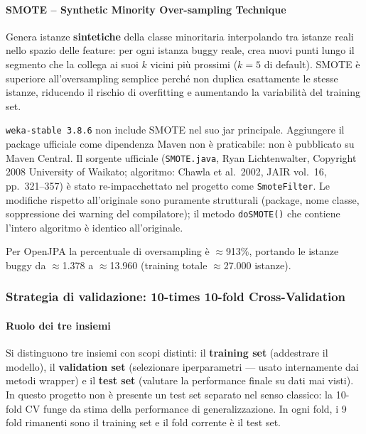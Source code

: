 \paragraph{SMOTE -- Synthetic Minority Over-sampling Technique}

Genera istanze \textbf{sintetiche} della classe minoritaria interpolando tra istanze reali
nello spazio delle feature: per ogni istanza buggy reale, crea nuovi punti lungo il
segmento che la collega ai suoi $k$ vicini più prossimi ($k=5$ di default). SMOTE è
superiore all'oversampling semplice perché non duplica esattamente le stesse istanze,
riducendo il rischio di overfitting e aumentando la variabilità del training set.

\texttt{weka-stable 3.8.6} non include SMOTE nel suo jar principale. Aggiungere il
package ufficiale come dipendenza Maven non è praticabile: non è pubblicato su Maven
Central. Il sorgente ufficiale (\texttt{SMOTE.java}, Ryan Lichtenwalter, Copyright 2008
University of Waikato; algoritmo: Chawla et al.\ 2002, JAIR vol.~16, pp.~321--357) è
stato re-impacchettato nel progetto come \texttt{SmoteFilter}. Le modifiche rispetto
all'originale sono puramente strutturali (package, nome classe, soppressione dei warning
del compilatore); il metodo \texttt{doSMOTE()} che contiene l'intero algoritmo è identico
all'originale.

Per OpenJPA la percentuale di oversampling è $\approx$913\%, portando le istanze buggy
da $\approx$1.378 a $\approx$13.960 (training totale $\approx$27.000 istanze).

\subsubsection{Strategia di validazione: 10-times 10-fold Cross-Validation}

\paragraph{Ruolo dei tre insiemi}

Si distinguono tre insiemi con scopi distinti: il \textbf{training set} (addestrare il
modello), il \textbf{validation set} (selezionare iperparametri --- usato internamente dai
metodi wrapper) e il \textbf{test set} (valutare la performance finale su dati mai visti).
In questo progetto non è presente un test set separato nel senso classico: la 10-fold CV
funge da stima della performance di generalizzazione. In ogni fold, i 9 fold rimanenti
sono il training set e il fold corrente è il test set.


